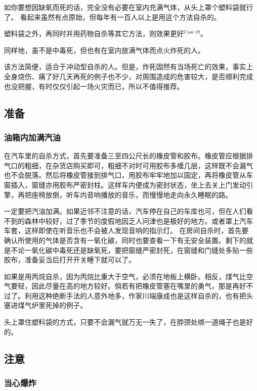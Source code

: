 \documentclass[UTF8]{ctexart}
\begin{document}
如你要想因缺氧而死的话，完全没有必要在室内充满气体，从头上罩个塑料袋就行了。
看起来虽然有点原始，但每年有一百人以上是用这个方法自杀的。

塑料袋之外，再同时并用药物自杀等其它方法，则效果更好$^{\mathrm{Case\ 19}}$。
 
同样地，虽不是中毒死，但也有在室内放满气体而点火炸死的人。

该方法简便，适合于冲动型自杀的人。但是，炸死固然有当场死亡的效果，事实上全身烧伤、痛了好几天再死的例子也不少，对周围造成的危害较大，是否顺利完成也没把握，有时仅仅引起一场火灾而已，所以不值得推荐。

\subsection{准备}

\subsubsection*{油箱内加满汽油}

在汽车里的自杀方式，首先要准备三至四公尺长的橡皮管和胶布。橡皮管应根据排气口的粗细，在杂货店购买即可，粗细不对时可用胶布多缠几层，这样既不会漏气也不会脱落。然后将橡皮管接到排气口，用胶布牢牢地加以固定，再将橡皮管从车窗插入，窗缝亦用胶布严密封柱。这样车内便成为密封状态，坐上去关上门发动引擎，再把座椅放倒，听车内音响播放的音乐，而慢慢地走向永久睡眠的路。

一定要把汽油加满。如果近邻不注意的话，汽车停在自己的车库也可，但在人们看不到的森林中较好，过了季节的度假地因乏人问津也是极好的地方。或者罩上汽车车套，这样即使在听音乐也不会被人发现音响的指示灯。
在房间自杀时，首先要确认所使用的气体是否含有一氧化碳，同时也要查看一下有无安全装置。剩下的就是不论一氧化碳中毒死还是缺氧死，要把窗缝严密封死，在窗缝和门缝处多贴一些胶布，准备妥当后打开开关睡下就可以了。

如果是用丙烷自杀，因为丙烷比重大于空气，必须在地板上横卧。相反，煤气比空气要轻，因此尽量在高的地方较好。倘若有把橡皮管塞在嘴里的勇气，那是再好不过了。利用这种绝断手法的人意外地多，作家川端康成也是这样自杀的，也有把头塞进煤气炉里死掉的例子。

头上罩住塑料袋的方式，只要不会漏气就万无一失了，在脖颈处绑一道绳子也是好的。

\subsection{注意}

\subsubsection*{当心爆炸}
\end{document}
